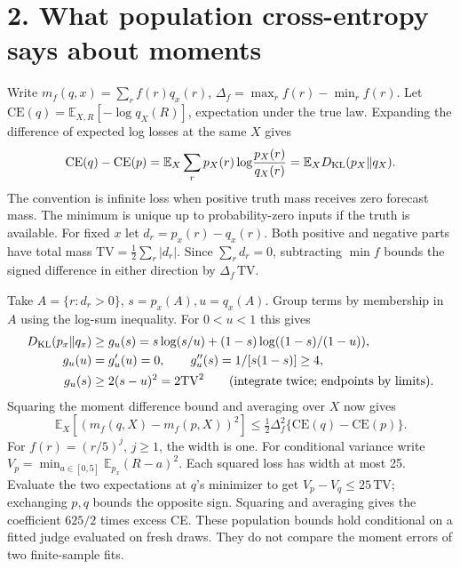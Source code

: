 \documentclass[11pt]{article}
\newcommand{\E}{\mathbb E}\newcommand{\Var}{\operatorname{Var}}\newcommand{\Cov}{\operatorname{Cov}}
\newcommand{\TV}{\mathrm{TV}}\newcommand{\CE}{\mathrm{CE}}
\begin{document}
\newpage
\section*{2. What population cross-entropy says about moments}
Write $m_f(q,x)=\sum_r f(r)q_x(r)$, $\Delta_f=\max_r f(r)-\min_r f(r)$. Let $\CE(q)=\E_{X,R}[-\log q_X(R)]$, expectation under the true law. Expanding the difference of expected log losses at the same $X$ gives
\[
\CE(q)-\CE(p)=\E_X\sum_r p_X(r)\log\!\frac{p_X(r)}{q_X(r)}
             =\E_X\KL(p_X\Vert q_X).
\]
The convention is infinite loss when positive truth mass receives zero forecast mass. The minimum is unique up to probability-zero inputs if the truth is available. For fixed $x$ let $d_r=p_x(r)-q_x(r)$. Both positive and negative parts have total mass $\TV=\tfrac12\sum_r|d_r|$. Since $\sum_r d_r=0$, subtracting $\min f$ bounds the signed difference in either direction by $\Delta_f\,\TV$.

Take $A=\{r:d_r>0\}$, $s=p_x(A),u=q_x(A)$. Group terms by membership in $A$ using the log-sum inequality. For $0<u<1$ this gives
\begin{align*}
\KL(p_x\Vert q_x)&\ge g_u(s)
 =s\log(s/u)+(1-s)\log((1-s)/(1-u)),\\
g_u(u)&=g_u'(u)=0,\qquad g_u''(s)=1/[s(1-s)]\ge 4,\\
g_u(s)&\ge 2(s-u)^2=2\TV^2 \qquad\text{(integrate twice; endpoints by limits).}
\end{align*}
Squaring the moment difference bound and averaging over $X$ now gives
\[
\boxed{\E_X[(m_f(q,X)-m_f(p,X))^2]\le \tfrac12\Delta_f^2\{\CE(q)-\CE(p)\}.}
\]
For $f(r)=(r/5)^j$, $j\ge1$, the width is one. For conditional variance write
$V_p=\min_{a\in[0,5]}\E_{p_x}(R-a)^2$. Each squared loss has width at most 25. Evaluate the two expectations at $q$'s minimizer to get $V_p-V_q\le25\,\TV$; exchanging $p,q$ bounds the opposite sign. Squaring and averaging gives the coefficient $625/2$ times excess CE. These population bounds hold conditional on a fitted judge evaluated on fresh draws. They do not compare the moment errors of two finite-sample fits.
\end{document}
